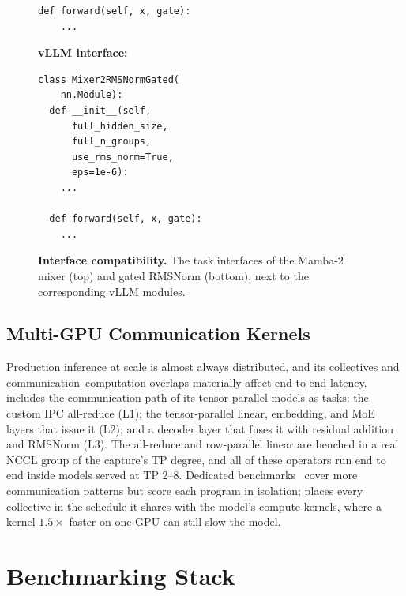 \begin{figure}[tbp]
\begin{minipage}[t]{0.48\linewidth}
\begin{lstlisting}[basicstyle=\ttfamily\scriptsize,columns=fullflexible,keepspaces=true,breaklines=true,showstringspaces=false,frame=single,aboveskip=2pt,belowskip=2pt]
  def forward(self, x, gate):
    ...
\end{lstlisting}
\end{minipage}
\hfill
\begin{minipage}[t]{0.48\linewidth}
\vspace{0pt}
\textbf{vLLM interface:}
\begin{lstlisting}[basicstyle=\ttfamily\scriptsize,columns=fullflexible,keepspaces=true,breaklines=true,showstringspaces=false,frame=single,aboveskip=2pt,belowskip=2pt]
class Mixer2RMSNormGated(
    nn.Module):
  def __init__(self,
      full_hidden_size,
      full_n_groups,
      use_rms_norm=True,
      eps=1e-6):
    ...

  def forward(self, x, gate):
    ...
\end{lstlisting}
\end{minipage}
\caption{\textbf{Interface compatibility.} The \FastKernels task interfaces of the Mamba-2 mixer (top) and gated RMSNorm (bottom), next to the corresponding vLLM modules.}
\label{fastkernels:fig:interface}
\end{figure}

\subsection{Multi-GPU Communication Kernels}
\label{fastkernels:sec:multigpu}

Production inference at scale is almost always distributed, and its collectives and communication--computation overlaps materially affect end-to-end latency.
\FastKernels includes the communication path of its tensor-parallel models as tasks: the custom IPC all-reduce (L1); the tensor-parallel linear, embedding, and MoE layers that issue it (L2); and a decoder layer that fuses it with residual addition and RMSNorm (L3).
The all-reduce and row-parallel linear are benched in a real NCCL group of the capture's TP degree, and all of these operators run end to end inside models served at TP 2--8.
Dedicated benchmarks~\citep{commbench,parallelkernelbench} cover more communication patterns but score each program in isolation; \FastKernels places every collective in the schedule it shares with the model's compute kernels, where a kernel $1.5\times$ faster on one GPU can still slow the model.

\section{Benchmarking Stack}
\label{fastkernels:sec:benchmarking_tooling}

